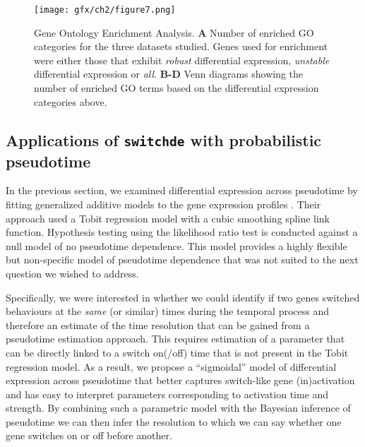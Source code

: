 \begin{figure}
\centering
	\texttt{[image: gfx/ch2/figure7.png]}
\caption[Gene Ontology Enrichment Analysis.]{ Gene Ontology Enrichment Analysis.
\textbf{A} Number of enriched GO categories for the three datasets studied. Genes used for enrichment were either those that exhibit \emph{robust} differential expression, \emph{unstable} differential expression or \emph{all}.
\textbf{B-D} Venn diagrams showing the number of enriched GO terms based on the differential expression categories above.} \label{fig:go_enrichment}
\end{figure}


\subsection{Applications of \texttt{switchde} with probabilistic pseudotime}

In the previous section, we examined differential expression across pseudotime by fitting generalized additive models to the gene expression profiles \cite{Trapnell2014-xi}. Their approach used a Tobit regression model with a cubic smoothing spline link function. Hypothesis testing using the likelihood ratio test is conducted against a null model of no pseudotime dependence. This model provides a highly flexible but non-specific model of pseudotime dependence that was not suited to the next question we wished to address.

Specifically, we were interested in whether we could identify if two genes switched behaviours at the \emph{same} (or similar) times during the temporal process and therefore an estimate of the time resolution that can be gained from a pseudotime estimation approach. This requires estimation of a parameter that can be directly linked to a switch on(/off) time that is not present in the Tobit regression model. As a result, we propose a ``sigmoidal'' model of differential expression across pseudotime that better captures switch-like gene (in)activation and has easy to interpret parameters corresponding to activation time and strength. By combining such a parametric model with the Bayesian inference of pseudotime we can then infer the resolution to which we can say whether one gene switches on or off before another.

